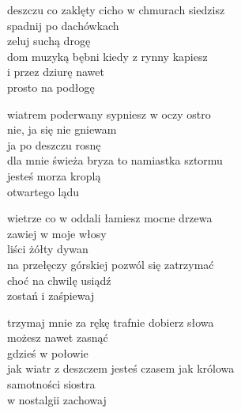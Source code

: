 \begin{text}
    deszczu co zaklęty cicho w chmurach siedzisz\\
    spadnij po dachówkach\\
    zeluj suchą drogę\\
    dom muzyką bębni kiedy z rynny kapiesz\\
    i przez dziurę nawet\\
    prosto na podłogę

    wiatrem poderwany sypniesz w oczy ostro\\
    nie, ja się nie gniewam\\
    ja po deszczu rosnę\\
    dla mnie świeża bryza to namiastka sztormu\\
    jesteś morza kroplą\\
    otwartego lądu

    wietrze co w oddali łamiesz mocne drzewa\\
    zawiej w moje włosy\\
    liści żółty dywan\\
    na przełęczy górskiej pozwól się zatrzymać\\
    choć na chwilę usiądź\\
    zostań i zaśpiewaj

    trzymaj mnie za rękę trafnie dobierz słowa\\
    możesz nawet zasnąć\\
    gdzieś w połowie\\
    jak wiatr z deszczem jesteś czasem jak królowa\\
    samotności siostra\\
    w nostalgii zachowaj
\end{text}
\begin{chord}

\end{chord}